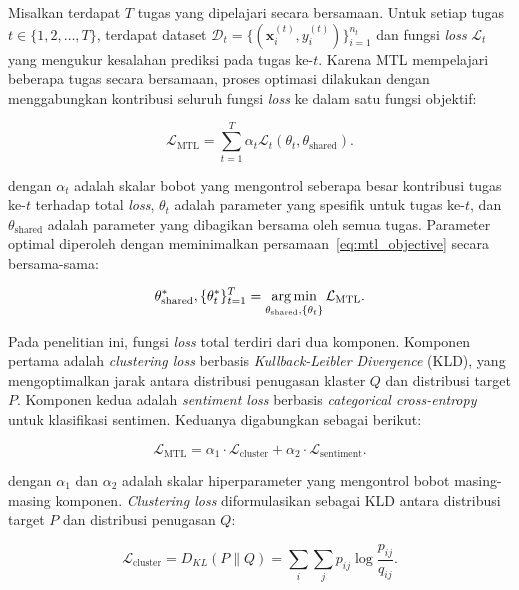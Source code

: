 Misalkan terdapat $T$ tugas yang dipelajari secara bersamaan. Untuk setiap
tugas $t \in \{1, 2, \ldots, T\}$, terdapat dataset
$\mathcal{D}_t = \{(\mathbf{x}_i^{(t)}, y_i^{(t)})\}_{i=1}^{n_t}$ dan
fungsi \textit{loss} $\mathcal{L}_t$ yang mengukur kesalahan prediksi pada
tugas ke-$t$. Karena MTL mempelajari beberapa tugas secara bersamaan,
proses optimasi dilakukan dengan menggabungkan kontribusi seluruh fungsi
\textit{loss} ke dalam satu fungsi objektif:

\begin{equation}
    \mathcal{L}_{\text{MTL}} = \sum_{t=1}^{T} \alpha_t
    \mathcal{L}_t(\theta_t, \theta_{\text{shared}}).
    \label{eq:mtl_objective}
\end{equation}

\noindent dengan $\alpha_t$ adalah skalar bobot yang mengontrol seberapa besar
kontribusi tugas ke-$t$ terhadap total \textit{loss}, $\theta_t$ adalah
parameter yang spesifik untuk tugas ke-$t$, dan $\theta_{\text{shared}}$
adalah parameter yang dibagikan bersama oleh semua tugas. Parameter
optimal diperoleh dengan meminimalkan
persamaan~\eqref{eq:mtl_objective} secara bersama-sama:

\begin{equation}
    \theta_{\text{shared}}^*, \{\theta_t^*\}_{t=1}^{T} =
    \operatorname*{arg\,min}_{\theta_{\text{shared}}, \{\theta_t\}}
    \mathcal{L}_{\text{MTL}}.
    \label{eq:mtl_optimization}
\end{equation}

Pada penelitian ini, fungsi \textit{loss} total terdiri dari dua
komponen. Komponen pertama adalah \textit{clustering loss} berbasis
\textit{Kullback-Leibler Divergence} (KLD), yang mengoptimalkan jarak
antara distribusi penugasan klaster $Q$ dan distribusi target $P$.
Komponen kedua adalah \textit{sentiment loss} berbasis
\textit{categorical cross-entropy} untuk klasifikasi sentimen. Keduanya
digabungkan sebagai berikut:

\begin{equation}
    \mathcal{L}_{\text{MTL}} = \alpha_1 \cdot \mathcal{L}_{\text{cluster}}
    + \alpha_2 \cdot \mathcal{L}_{\text{sentiment}}.
    \label{eq:loss_total}
\end{equation}

\noindent dengan $\alpha_1$ dan $\alpha_2$ adalah skalar hiperparameter yang
mengontrol bobot masing-masing komponen. \textit{Clustering loss}
diformulasikan sebagai KLD antara distribusi target $P$ dan distribusi
penugasan $Q$:

\begin{equation}
    \mathcal{L}_{\text{cluster}} = D_{KL}(P \| Q)
    = \sum_{i} \sum_{j} p_{ij} \log \frac{p_{ij}}{q_{ij}}.
    \label{eq:kld_loss}
\end{equation}

